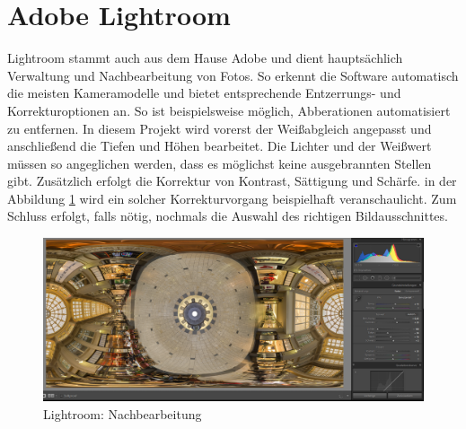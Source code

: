 \documentclass[liststotoc,bibtotoc,fontsize=14pt,]{scrreprt}
\begin{document}
	\section{Adobe Lightroom}
	\label{sec:lightroom}
	Lightroom stammt auch aus dem Hause Adobe und dient hauptsächlich Verwaltung und Nachbearbeitung von Fotos. So erkennt die Software automatisch die meisten Kameramodelle und bietet entsprechende Entzerrungs- und Korrekturoptionen an. So ist beispielsweise möglich, Abberationen automatisiert zu entfernen. In diesem Projekt wird vorerst der Weißabgleich angepasst und anschließend die Tiefen und Höhen bearbeitet. Die Lichter und der Weißwert müssen so angeglichen werden, dass es möglichst keine ausgebrannten Stellen gibt. Zusätzlich erfolgt die Korrektur von Kontrast, Sättigung und Schärfe. in der Abbildung \ref{img:lightroom_bearbeitung} wird ein solcher Korrekturvorgang beispielhaft veranschaulicht. Zum Schluss erfolgt, falls nötig, nochmals die Auswahl des richtigen Bildausschnittes.
	\begin{figure}[H]
		\includegraphics[width=\linewidth]{img/steps/Lightroom_kugel.PNG}
		\caption{Lightroom: Nachbearbeitung}
		\label{img:lightroom_bearbeitung}
	\end{figure}
	
\end{document}
